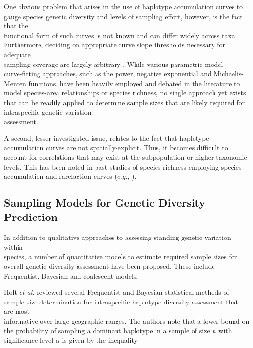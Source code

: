 One obvious problem that arises in the use of haplotype accumulation curves to gauge species genetic diversity and levels of sampling effort, however, is the fact that the \\ functional form of such curves is not known and can differ widely across taxa \cite{phillips2015exploration}. \\ Furthermore, deciding on appropriate curve slope thresholds necessary for adequate \\ sampling coverage are largely arbitrary \cite{hortal2005ed}. While various parametric model \\ curve-fitting approaches, such as the power, negative exponential and Michaelis-Menten functions, have been heavily employed and debated in the literature to model species-area relationships \cite{dengler2009function, tjorve2003shapes} or species richness, no single approach yet exists that can be readily applied to determine sample sizes that are likely required for intraspecific genetic variation \\ assessment.

\vspace{5mm}

A second, lesser-investigated issue, relates to the fact that haplotype accumulation curves are not spatially-explicit. Thus, it becomes difficult to account for correlations that may exist at the subpopulation or higher taxonomic levels. This has been noted in past studies of species richness employing species accumulation and rarefaction curves (\textit{e.g.}, \cite{bevilacqua2017approach, chiarucci2009spatially, terlizzi2014species}).

\vspace{5mm}

\subsection{Sampling Models for Genetic Diversity Prediction}

In addition to qualitative approaches to assessing standing genetic variation within \\ species, a number of quantitative models to estimate required sample sizes for overall genetic diversity assessment have been proposed. These include Frequentist, Bayesian and coalescent models.

\vspace{5mm}

Holt \textit{et al.} \cite{holt2007experimental} reviewed several Frequentist and Bayesian statistical methods of sample size determination for intraspecific haplotype diversity assessment that are most \\ informative over large geographic ranges. The authors note that a lower bound on the probability of sampling a dominant haplotype in a sample of size $n$ with significance level $\alpha$ is given by the inequality

